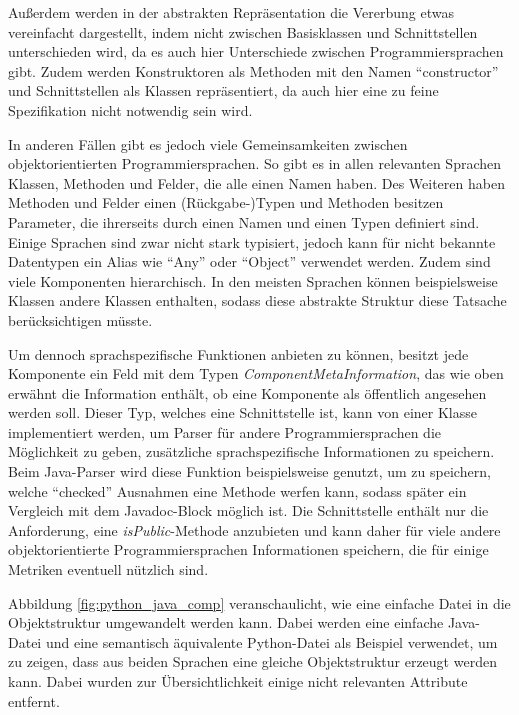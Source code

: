 Außerdem werden in der abstrakten Repräsentation die Vererbung etwas vereinfacht dargestellt, indem nicht zwischen Basisklassen und Schnittstellen unterschieden wird, da es auch hier Unterschiede zwischen Programmiersprachen gibt. Zudem werden Konstruktoren als Methoden mit den Namen \enquote{constructor} und Schnittstellen als Klassen repräsentiert, da auch hier eine zu feine Spezifikation nicht notwendig sein wird.  

  

In anderen Fällen gibt es jedoch viele Gemeinsamkeiten zwischen objektorientierten Programmiersprachen. So gibt es in  allen relevanten Sprachen Klassen, Methoden und Felder, die alle einen Namen haben. Des Weiteren haben Methoden und Felder einen (Rückgabe-)Typen und Methoden besitzen Parameter, die ihrerseits durch einen Namen und einen Typen definiert sind. Einige Sprachen sind zwar nicht stark typisiert, jedoch kann für nicht bekannte Datentypen ein Alias wie \enquote{Any} oder  \enquote{Object} verwendet werden.  Zudem sind viele Komponenten hierarchisch. In den meisten Sprachen können beispielsweise Klassen andere Klassen enthalten, sodass diese abstrakte Struktur diese Tatsache berücksichtigen müsste. 

Um dennoch sprachspezifische Funktionen anbieten zu können, besitzt jede Komponente ein Feld mit dem Typen \textit{ComponentMetaInformation}, das wie oben erwähnt die Information enthält, ob eine Komponente als öffentlich angesehen werden soll. Dieser Typ, welches eine Schnittstelle ist, kann von einer Klasse implementiert werden, um Parser für andere Programmiersprachen die Möglichkeit zu geben, zusätzliche sprachspezifische Informationen zu speichern. Beim Java-Parser wird diese Funktion beispielsweise genutzt, um zu speichern, welche \enquote{checked} Ausnahmen eine Methode werfen kann, sodass später ein Vergleich mit dem Javadoc-Block möglich ist. Die Schnittstelle enthält nur die Anforderung, eine \textit{isPublic}-Methode anzubieten und kann daher für viele andere objektorientierte Programmiersprachen Informationen speichern, die für einige Metriken eventuell nützlich sind. 





Abbildung \ref{fig:python_java_comp} veranschaulicht, wie eine einfache Datei in die Objektstruktur umgewandelt werden kann. Dabei werden eine einfache Java-Datei und eine semantisch äquivalente Python-Datei als Beispiel verwendet, um zu zeigen, dass aus beiden Sprachen eine gleiche Objektstruktur erzeugt werden kann. Dabei wurden zur Übersichtlichkeit einige nicht relevanten Attribute entfernt.



